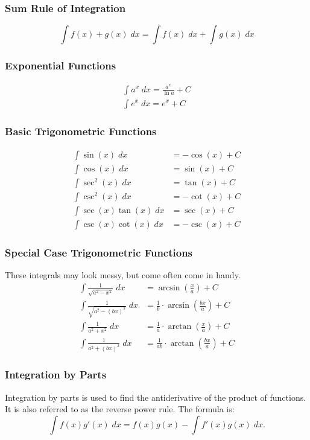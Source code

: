 \subsubsection{Sum Rule of Integration}
\[ \int f(x) + g(x) \; dx = \int f(x) \; dx + \int g(x) \; dx \]

\subsubsection{Exponential Functions}
\begin{gather*}
	\int a^x \; dx = \frac{a^x}{\ln a} + C \\[5pt]
	\int e^x \; dx = e^x + C
\end{gather*}

\subsubsection{Basic Trigonometric Functions}
\begin{align*}
	\int \sin(x) \; dx &= -\cos(x) + C \\[5pt]
	\int \cos(x) \; dx &= \sin(x) + C \\[5pt]
	\int \sec^2(x) \; dx &= \tan(x) + C \\[5pt]
	\int \csc^2(x) \; dx &= -\cot(x) + C \\[5pt]
	\int \sec(x) \tan(x) \; dx &= \sec(x) + C \\[5pt]
	\int \csc(x) \cot(x) \; dx &= -\csc(x) + C
\end{align*}

\subsubsection{Special Case Trigonometric Functions}
These integrals may look messy, but come often come in handy.
\begin{align*}
	\int \frac{1}{\sqrt{a^2 - x^2}} \; dx &= \arcsin \left( \frac{x}{a} \right) + C \\[5pt]
	\int \frac{1}{\sqrt{a^2 - (bx)^2}} \; dx &= \frac{1}{b} \cdot \arcsin \left( \frac{bx}{a} \right) + C \\[5pt]
	\int \frac{1}{a^2 + x^2} \; dx &= \frac{1}{a} \cdot \arctan \left( \frac{x}{a} \right) + C \\[5pt]
	\int \frac{1}{a^2 + (bx)^2} \; dx &= \frac{1}{ab} \cdot \arctan \left( \frac{bx}{a} \right) + C
\end{align*}

\subsubsection{Integration by Parts}
Integration by parts is used to find the antiderivative of the product of functions. It is also referred to as the reverse power rule. The formula is:
\[ \int f(x) g'(x) \; dx = f(x) g(x) - \int f'(x) g(x) \; dx. \]

